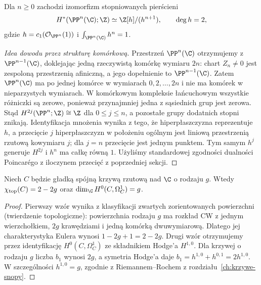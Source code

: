 \begin{twierdzenie}
\label{tw:ga10-cp-cohom}
Dla $n\ge0$ zachodzi izomorfizm stopniowanych pierścieni
\[
 H^*(\PP^n(\C);\Z)\simeq\Z[h]/(h^{n+1}),
 \qquad \deg h=2,
\]
gdzie $h=c_1(\mathcal O_{\PP^n}(1))$ i
$\int_{\PP^n(\C)}h^n=1$.
\end{twierdzenie}
\begin{proof}[Idea dowodu przez strukturę komórkową]
Przestrzeń $\PP^n(\C)$ otrzymujemy z
$\PP^{n-1}(\C)$, doklejając jedną rzeczywistą komórkę
wymiaru $2n$: chart $Z_n\ne0$ jest zespoloną przestrzenią
afiniczną, a jego dopełnienie to $\PP^{n-1}(\C)$.
Zatem $\PP^n(\C)$ ma po jednej komórce
w wymiarach $0,2,\ldots,2n$ i nie ma komórek
w nieparzystych wymiarach. W komórkowym kompleksie
łańcuchowym wszystkie różniczki są zerowe,
ponieważ przynajmniej jedna z sąsiednich grup jest zerowa.
Stąd $H^{2j}(\PP^n;\Z)\cong\Z$ dla $0\le j\le n$,
a pozostałe grupy dodatnich stopni znikają.
Identyfikacja mnożenia wynika z tego, że hiperpłaszczyzna
reprezentuje $h$, a przecięcie $j$ hiperpłaszczyzn w
położeniu ogólnym jest liniową przestrzenią rzutową
kowymiaru $j$; dla $j=n$ przecięcie jest jednym punktem.
Tym samym $h^j$ generuje $H^{2j}$ i $h^n$ ma całkę równą $1$.
Użyliśmy standardowej zgodności dualności Poincarégo
z iloczynem przecięć z poprzedniej sekcji.
\end{proof}

\begin{stwierdzenie}
Niech $C$ będzie gładką spójną krzywą rzutową nad $\C$
o rodzaju $g$. Wtedy $\chi_{\rm top}(C)=2-2g$ oraz
$\dim_{\C}H^0(C,\Omega^1_C)=g$.
\end{stwierdzenie}
\begin{proof}
Pierwszy wzór wynika z klasyfikacji zwartych zorientowanych
powierzchni (twierdzenie topologiczne): powierzchnia rodzaju $g$
ma rozkład CW z jednym wierzchołkiem, $2g$ krawędziami
i jedną komórką dwuwymiarową. Dlatego jej charakterystyka
Eulera wynosi $1-2g+1=2-2g$.
Drugi wzór otrzymujemy przez identyfikację
$H^0(C,\Omega^1_C)$ ze składnikiem Hodge'a $H^{1,0}$.
Dla krzywej o rodzaju $g$ liczba $b_1$ wynosi $2g$,
a symetria Hodge'a daje $b_1=h^{1,0}+h^{0,1}=2h^{1,0}$.
W szczególności $h^{1,0}=g$, zgodnie z Riemannem--Rochem
z rozdziału~\ref{ch:krzywe-snopy}.
\end{proof}

